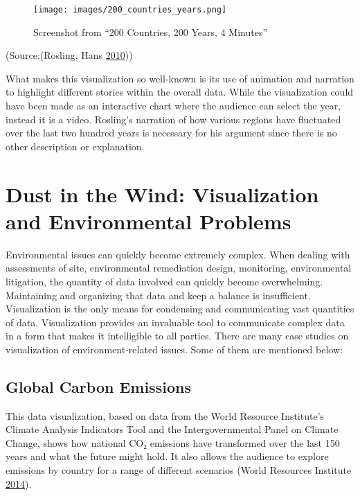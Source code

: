 \documentclass[]{book}
\begin{document}
\begin{figure}
\centering
\texttt{[image: images/200\_countries\_years.png]}
\caption{Screenshot from ``200 Countries, 200 Years, 4 Minutes''}
\end{figure}

(Source:(Rosling, Hans \protect\hyperlink{ref-hans_rosling}{2010}))

What makes this visualization so well-known is its use of animation and narration to highlight different stories within the overall data. While the visualization could have been made as an interactive chart where the audience can select the year, instead it is a video. Rosling's narration of how various regions have fluctuated over the last two hundred years is necessary for his argument since there is no other description or explanation.

\hypertarget{dust-in-the-wind-visualization-and-environmental-problems}{%
\section{Dust in the Wind: Visualization and Environmental Problems}\label{dust-in-the-wind-visualization-and-environmental-problems}}

Environmental issues can quickly become extremely complex. When dealing with assessments of site, environmental remediation design, monitoring, environmental litigation, the quantity of data involved can quickly become overwhelming. Maintaining and organizing that data and keep a balance is insufficient. Visualization is the only means for condensing and communicating vast quantities of data. Visualization provides an invaluable tool to communicate complex data in a form that makes it intelligible to all parties. There are many case studies on visualization of environment-related issues. Some of them are mentioned below:

\hypertarget{global-carbon-emissions}{%
\subsection{Global Carbon Emissions}\label{global-carbon-emissions}}

This data visualization, based on data from the World Resource Institute's Climate Analysis Indicators Tool and the Intergovernmental Panel on Climate Change, shows how national CO₂ emissions have transformed over the last 150 years and what the future might hold. It also allows the audience to explore emissions by country for a range of different scenarios (World Resources Institute \protect\hyperlink{ref-CO2_emission}{2014}).
\end{document}
